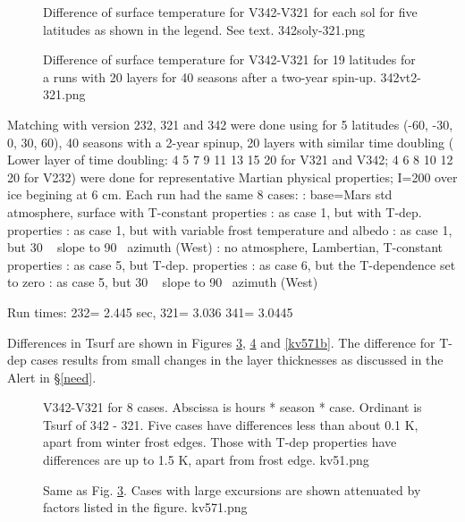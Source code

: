 \documentclass{article}
\begin{document}
 
\begin{figure}[!ht] 
\caption[V342-V321 for each sol]{Difference of surface temperature for V342-V321 for each sol for five latitudes as shown in the legend. See text.
\label{342soly-321} 342soly-321.png }
\end{figure} 

 
\begin{figure}[!ht] 
\caption[V342-V321 for 19 latitudes]{Difference of surface temperature for V342-V321 for 19 latitudes for a runs with 20 layers for 40 seasons after a two-year spin-up. 
\label{342vt2-321}  342vt2-321.png }
\end{figure} 


Matching with version 232, 321 and 342 were done using for 5 latitudes (-60,
-30, 0, 30, 60), 40 seasons with a 2-year spinup, 20 layers with similar time
doubling ( Lower layer of time doubling: 4 5 7 9 11 13 15 20 for V321 and V342; 4
6 8 10 12 20 for V232) were done for representative Martian physical properties; 
I=200 over ice begining at 6 cm. Each run had the same 8 cases:
: base=Mars std atmosphere, surface with T-constant properties
: as case 1, but with T-dep. properties
: as case 1, but with variable frost temperature and albedo
: as case 1, but 30 \qd~ slope to 90\qd~ azimuth (West) 
: no atmosphere, Lambertian, T-constant properties
: as case 5, but T-dep. properties
: as case 6, but the T-dependence set to zero
: as case 5, but 30 \qd~ slope to 90\qd~ azimuth (West) 

Run times: 232= 2.445 sec,  321= 3.036  341= 3.0445

Differences in Tsurf are shown in Figures \ref{kv57}, \ref{kv571} and
\ref{kv571b}. The difference for T-dep cases results from small changes in the
layer thicknesses as discussed in the Alert in \S \ref{need}.

\begin{figure}[!ht] 
\caption[V342-V321]{V342-V321 for 8 cases. Abscissa is hours * season *
  case. Ordinant is Tsurf of 342 - 321.  Five cases have differences less than
  about 0.1 K, apart from winter frost edges. Those with T-dep properties have differences are up to 1.5 K, apart from frost edge.
\label{kv57}  kv51.png }
\end{figure} 

\begin{figure}[!ht] 
\caption[V342-V321, attenuated]{Same as Fig. \ref{kv57}. Cases with large excursions are shown attenuated by factors listed in the figure.
\label{kv571}  kv571.png }
\end{figure} 
 
\end{document}
